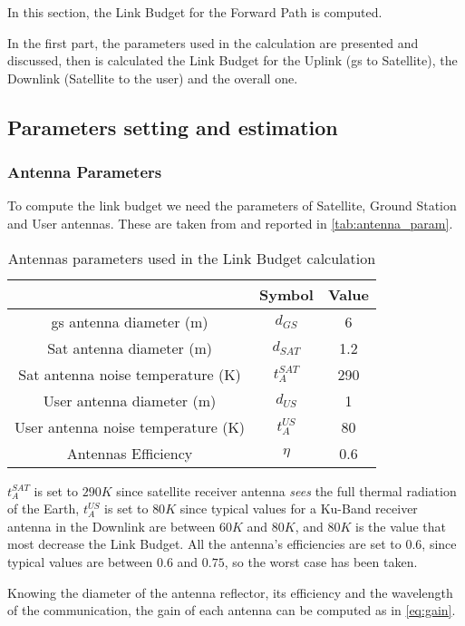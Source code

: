 In this section, the Link Budget for the Forward Path is computed.

In the first part, the parameters used in the calculation are presented and discussed, then is calculated the Link Budget for the Uplink (\gls{gs} to Satellite), the Downlink (Satellite to the user) and the overall one.
\subsection{Parameters setting and estimation}
	\subsubsection{Antenna Parameters}
		To compute the link budget we need the parameters of Satellite, Ground Station and User antennas. These are taken from \cite{ippolito17} and reported in \autoref{tab:antenna_param}.

		\begin{table}[h]
			\centering
			\begin{tabular}{ccc}
			\toprule
			& Symbol & Value\\
			\midrule
			\gls{gs} antenna diameter (m) & $d_{GS}$ & 6\\
			Sat antenna diameter (m) & $d_{SAT}$  & 1.2\\
			Sat antenna noise temperature (K)& $t_A^{SAT}$ & 290\\
			User antenna diameter (m)& $d_{US}$ & 1\\
			User antenna noise temperature (K)& $t_A^{US}$ & 80\\
			Antennas Efficiency & $\eta$ & 0.6\\
			\bottomrule
			\end{tabular}
			\caption{Antennas parameters used in the Link Budget calculation}
			\label{tab:antenna_param}
		\end{table}

		$t_A^{SAT}$ is set to $290K$ since satellite receiver antenna \textit{sees} the full thermal radiation of the Earth, $t_A^{US}$ is set to $80K$ since typical values for a Ku-Band receiver antenna in the Downlink are between $60K$ and $80K$, and $80K$ is the value that most decrease the Link Budget.
		All the antenna's efficiencies are set to $0.6$, since typical values are between $0.6$ and $0.75$, so the worst case has been taken.

		Knowing the diameter of the antenna reflector, its efficiency and the wavelength of the communication, the gain of each antenna can be computed as in \autoref{eq:gain}.

